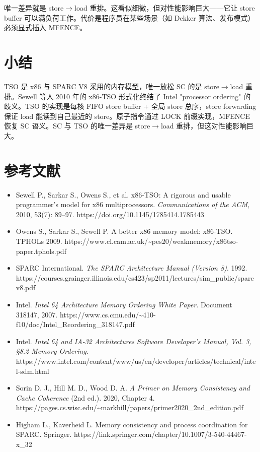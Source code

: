 唯一差异就是 store$\rightarrow$load 重排。这看似细微，但对性能影响巨大——它让 store buffer 可以满负荷工作。代价是程序员在某些场景（如 Dekker 算法、发布模式）必须显式插入 MFENCE。

\section{小结}

TSO 是 x86 与 SPARC V8 采用的内存模型，唯一放松 SC 的是 store$\rightarrow$load 重排。Sewell 等人 2010 年的 x86-TSO 形式化终结了 Intel "processor ordering" 的歧义。TSO 的实现是每核 FIFO store buffer + 全局 store 总序，store forwarding 保证 load 能读到自己最近的 store。原子指令通过 LOCK 前缀实现，MFENCE 恢复 SC 语义。SC 与 TSO 的唯一差异是 store$\rightarrow$load 重排，但这对性能影响巨大。

\section*{参考文献}
\begin{itemize}
\item Sewell P., Sarkar S., Owens S., et al. x86-TSO: A rigorous and usable programmer's model for x86 multiprocessors. \emph{Communications of the ACM}, 2010, 53(7): 89–97. https://doi.org/10.1145/1785414.1785443
\item Owens S., Sarkar S., Sewell P. A better x86 memory model: x86-TSO. TPHOLs 2009. https://www.cl.cam.ac.uk/\textasciitilde{}pes20/weakmemory/x86tso-paper.tphols.pdf
\item SPARC International. \emph{The SPARC Architecture Manual (Version 8)}. 1992. https://courses.grainger.illinois.edu/cs423/sp2011/lectures/sim\_public/sparcv8.pdf
\item Intel. \emph{Intel 64 Architecture Memory Ordering White Paper}. Document 318147, 2007. https://www.cs.cmu.edu/\textasciitilde{}410-f10/doc/Intel\_Reordering\_318147.pdf
\item Intel. \emph{Intel 64 and IA-32 Architectures Software Developer's Manual, Vol. 3, §8.2 Memory Ordering}. https://www.intel.com/content/www/us/en/developer/articles/technical/intel-sdm.html
\item Sorin D. J., Hill M. D., Wood D. A. \emph{A Primer on Memory Consistency and Cache Coherence} (2nd ed.). 2020, Chapter 4. https://pages.cs.wisc.edu/\textasciitilde{}markhill/papers/primer2020\_2nd\_edition.pdf
\item Higham L., Kaverheid L. Memory consistency and process coordination for SPARC. Springer. https://link.springer.com/chapter/10.1007/3-540-44467-x\_32
\end{itemize}
